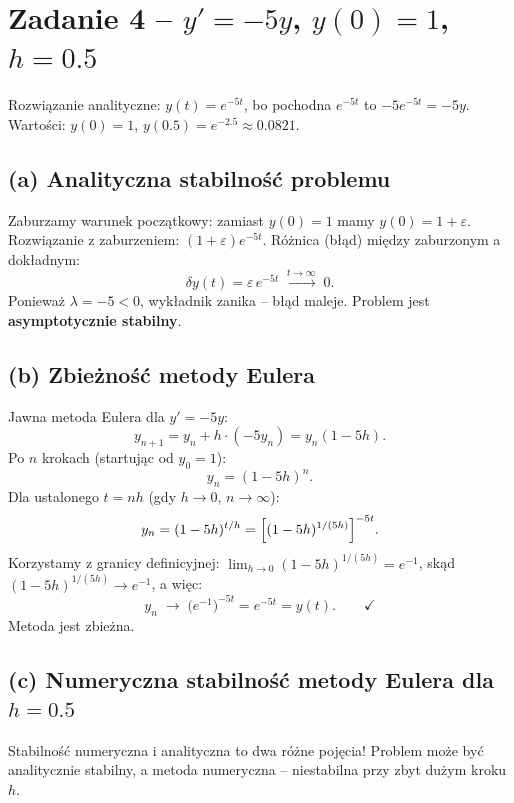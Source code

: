 \documentclass[a4paper,12pt]{article}
\begin{document}
\section*{Zadanie 4 -- $y' = -5y$, $y(0) = 1$, $h = 0.5$}

\begin{komentarz}
Rozwiązanie analityczne: $y(t) = e^{-5t}$, bo pochodna $e^{-5t}$ to $-5e^{-5t} = -5y$.
Wartości: $y(0)=1$, $y(0.5) = e^{-2.5} \approx 0.0821$.
\end{komentarz}

\subsection*{(a) Analityczna stabilność problemu}

Zaburzamy warunek początkowy: zamiast $y(0)=1$ mamy $y(0)=1+\varepsilon$.
Rozwiązanie z zaburzeniem: $(1+\varepsilon)e^{-5t}$.
Różnica (błąd) między zaburzonym a dokładnym:
\[
\delta y(t) = \varepsilon\, e^{-5t} \;\xrightarrow{t\to\infty}\; 0.
\]
Ponieważ $\lambda = -5 < 0$, wykładnik zanika -- błąd maleje.
Problem jest \textbf{asymptotycznie stabilny}.

\subsection*{(b) Zbieżność metody Eulera}

Jawna metoda Eulera dla $y' = -5y$:
\[
y_{n+1} = y_n + h\cdot(-5y_n) = y_n(1-5h).
\]
Po $n$ krokach (startując od $y_0 = 1$):
\[
y_n = (1-5h)^n.
\]
Dla ustalonego $t = nh$ (gdy $h\to 0$, $n\to\infty$):
\[
y_n = (1-5h)^{t/h} = \Bigl[(1-5h)^{1/(5h)}\Bigr]^{-5t}.
\]
Korzystamy z granicy definicyjnej: $\lim_{h\to 0}(1-5h)^{1/(5h)} = e^{-1}$,
skąd $(1-5h)^{1/(5h)} \to e^{-1}$, a więc:
\[
y_n \;\to\; \bigl(e^{-1}\bigr)^{-5t} = e^{-5t} = y(t). \qquad \checkmark
\]
Metoda jest zbieżna.

\subsection*{(c) Numeryczna stabilność metody Eulera dla $h=0.5$}

\begin{komentarz}
Stabilność numeryczna i analityczna to dwa różne pojęcia!
Problem może być analitycznie stabilny, a metoda numeryczna -- niestabilna przy
zbyt dużym kroku $h$.
\end{komentarz}
\end{document}
